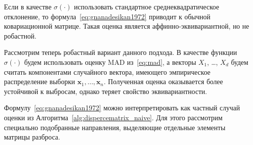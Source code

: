 Если в качестве $\sigma(\cdot)$ использовать стандартное среднеквадратическое отклонение, то формула~\eqref{eq:gnanadesikan1972} приводит к обычной ковариационной матрице. Такая оценка является аффинно-эквивариантной, но не робастной.

Рассмотрим теперь робастный вариант данного подхода. В качестве функции $\sigma(\cdot)$ будем использовать оценку MAD из~\eqref{eq:mad}, а векторы $X_1$, \ldots, $X_d$  будем считать компонентами случайного вектора, имеющего эмпирическое распределение выборки $\mathbf{x}_1,\ldots,\mathbf{x}_n$. Полученная оценка оказывается более устойчивой к выбросам, однако теряет свойство эквивариантности.

Формулу~\eqref{eq:gnanadesikan1972} можно интерпретировать как частный случай оценки из Алгоритма~\ref{alg:dispercematrix_naive}. Для этого рассмотрим специально подобранные направления, выделяющие отдельные элементы матрицы разброса.



